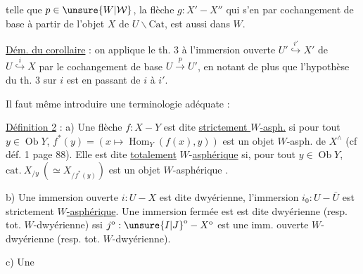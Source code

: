 
telle que $p\in\unsure{W|\mathcal W}$, la flèche $g:X'\mathbin{-}X''$ qui s'en  par cochangement de base à partir de l'objet $X$ de $U\backslash\mathrm{Cat}$, est aussi dans $W$.

\uline{Dém. du corollaire} : on applique le th. 3 à l'immersion ouverte $U'\overset{i'}{\hookrightarrow}X'$  de $U\overset{i}{\hookrightarrow}X$ par le cochangement de base $U\xrightarrow{p}U'$, en notant de plus que l'hypothèse du th. 3 sur $i$ est  en passant de $i$ à $i'$.

Il faut  même introduire une terminologie adéquate :

\uline{Définition 2} : a) Une flèche $f:X\mathbin{-}Y$ est dite \uline{strictement $W$-asph.} si pour tout $y\in\operatorname{Ob}Y$, $f^{*}(y)=(x\longmapsto\operatorname{Hom}_{Y}(f(x),y))$ est un objet  $W$-asph. de $X^{\wedge}$ (cf déf. 1 page 88). Elle est dite  \uline{totalement} $W$-\uline{asphérique} si, pour tout $y\in\operatorname{Ob}Y$, $\mathrm{cat.}\ X_{/y}\ (\simeq X_{/f^{*}(y)})$ est un objet  $W$-asphérique .

b) Une immersion ouverte $i:U\mathbin{-}X$ est dite  dwyérienne,   l'immersion  $i_0:U\mathbin{-}\bar U$ est strictement  \uline{$W$-asphérique}. Une immersion fermée est   est dite dwyérienne (resp. tot. $W$-dwyérienne) ssi $j^{\mathrm o}:\unsure{I|J}^{\mathrm o}\mathbin{-}X^{\mathrm o}$ est une imm. ouverte $W$-dwyérienne (resp. tot. $W$-dwyérienne).

c) Une  
